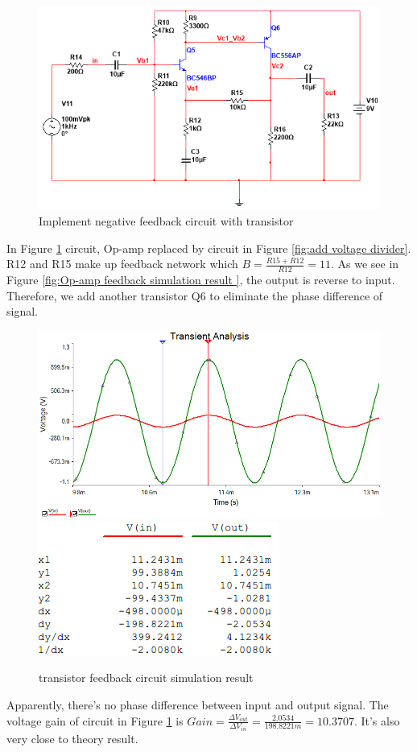 \begin{figure}[htbp]
\centering
\includegraphics[scale=0.6]{"../Photo/Chap2/transistor feedback"}
\caption{Implement negative feedback circuit with transistor}
\label{fig:transistorfeedback}
\end{figure}

In Figure \ref{fig:transistorfeedback} circuit, Op-amp replaced by circuit in Figure \ref{fig:add voltage divider}. R12 and R15 make up feedback network which $ B = \frac{R15+R12}{R12} = 11 $. As we see in Figure \ref{fig:Op-amp  feedback simulation result }, the output is reverse to input. Therefore, we add another transistor Q6 to eliminate the phase difference of signal.


\begin{figure}[htbp]
\centering
\includegraphics[scale=0.6]{"../Photo/Chap2/transistor feedback simulation wave"}\\[0.5cm]
\includegraphics[scale=1]{"../Photo/Chap2/transistor feedback simulation cursor data"}
\caption{transistor feedback circuit simulation result}
\label{fig:transistorfeedbacksimulationwave}
\end{figure}

Apparently, there's no phase difference between input and output signal. 
The voltage gain of circuit in Figure \ref{fig:transistorfeedback} is $ Gain = \frac{\Delta V_{out}}{\Delta V_{in}} = \frac{2.0534}{198.8221m} = 10.3707$. It's also very close to theory result.
 
 
